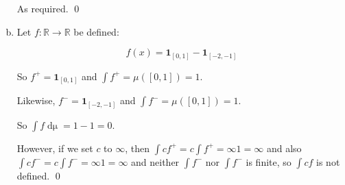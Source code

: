 \documentclass[11pt,oneside]{article}
\numberwithin{equation}{section}
\theoremstyle{definition}
\def\RR{\mathbb{R}}
\def\one{\mathbf{1}}
\begin{document}
\begin{solution}
\begin{enumerate}[(a)]
  As required.  \qed  

  
\item
  Let $f : \RR \to \RR$ be defined:

  \[
  f(x) =  \one_{[0, 1]} - \one_{[-2, -1]}
  \]

  So $f^+ =  \one_{[0, 1]}$ and $\int f^+ = \mu([0,1]) = 1.$

  Likewise, $f^- =  \one_{[-2, -1]}$ and $\int f^- = \mu([0,1]) = 1$.

  So $\int f \mathop{d \mu} = 1 - 1 = 0$.

  However, if we set $c$ to $\infty$, then $ \int c f^+ = c \int f^+ = \infty 1 = \infty$ and
  also  $ \int c f^- = c \int f^- = \infty 1 = \infty$ and neither $\int f^-$ nor $\int f^-$ is finite, so
  $\int c f$ is not defined.  
  \qed
  
\end{enumerate}
\end{solution}
\end{document}
